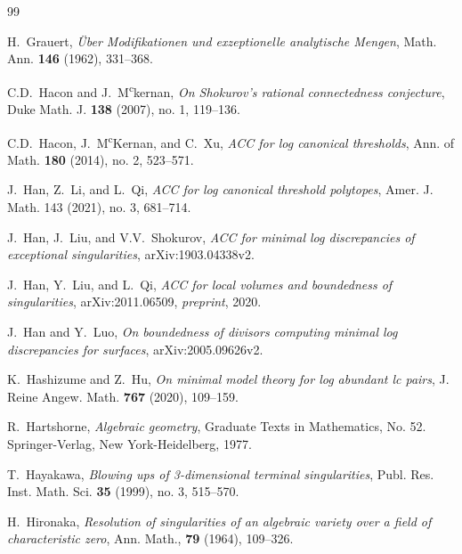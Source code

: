 \documentclass[11pt]{amsart}
\numberwithin{equation}{section}
\theoremstyle{definition}
\theoremstyle{definition}
\begin{document}
\begin{thebibliography}{99}

H.~Grauert, \textit{\"{U}ber {M}odifikationen und exzeptionelle analytische {M}engen}, Math. Ann. \textbf{146} (1962), 331--368.


 C.D.~Hacon and J.~M\textsuperscript{c}kernan, \textit{On Shokurov's rational connectedness conjecture}, Duke Math. J. \textbf{138} (2007), no. 1, 119--136.


 C.D.~Hacon, J.~M\textsuperscript{c}Kernan, and C.~Xu, \textit{ACC for log canonical thresholds}, Ann. of Math. \textbf{180} (2014), no. 2, 523--571.

 J.~Han, Z.~Li, and L.~Qi, \textit{ACC for log canonical threshold polytopes}, Amer. J. Math. 143 (2021), no. 3, 681--714.

 J.~Han, J.~Liu, and V.V.~Shokurov, \textit{ACC for minimal log discrepancies of exceptional singularities}, arXiv:1903.04338v2.

 J.~Han, Y.~Liu, and L.~Qi, \textit{ACC for local volumes and boundedness of singularities}, arXiv:2011.06509, \emph{preprint}, 2020.

 J.~Han and Y.~Luo,
\textit{On boundedness of divisors computing minimal log discrepancies for surfaces}, arXiv:2005.09626v2.

K.~Hashizume and Z.~Hu, \textit{On minimal model theory for log abundant lc pairs}, J. Reine Angew. Math. \textbf{767} (2020), 109--159.

 R.~Hartshorne,
\textit{Algebraic geometry}, 
Graduate Texts in Mathematics, No. 52. Springer-Verlag, New York-Heidelberg, 1977.

T.~Hayakawa, \textit{Blowing ups of 3-dimensional terminal singularities}, Publ. Res. Inst. Math. Sci. \textbf{35} (1999), no. 3, 515--570.

H.~Hironaka, \textit{Resolution of singularities of an algebraic variety over a field of characteristic zero}, Ann. Math., \textbf{79} (1964), 109--326.


\end{thebibliography}
\end{document}
